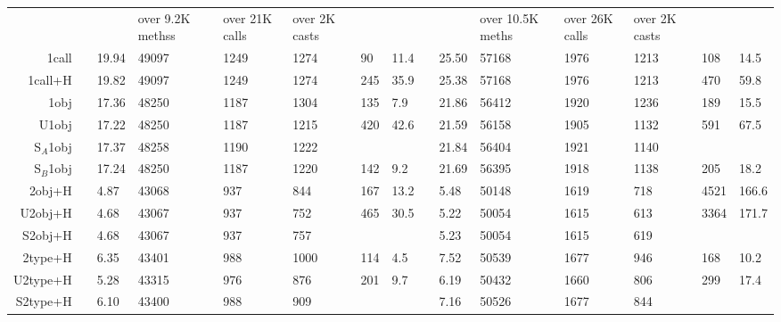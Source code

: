 \begin{table}
{\begin{tabular}{|r|c|l|p{1cm}|p{1cm}|p{1cm}!{\vrule width 2pt}l|l!{\vrule width 2pt}c|l|p{1cm}|p{1cm}|p{1cm}!{\vrule width 2pt}l|l|}
 &
over 9.2K methss &
over 21K calls &
over 2K casts &
 &
over 10.5K meths &
over 26K calls &
over 2K casts &
 \\
1call &  & 19.94 & 49097 & 1249 & 1274 & 90 & 11.4 &  & 25.50 & 57168 & 1976 & 1213 & 108 & 14.5 \\
1call+H & & 19.82 & 49097 & 1249 & 1274 & 245 & 35.9 & & 25.38 & 57168 & 1976 & 1213 & 470 & 59.8 \\
1obj & & 17.36 & 48250 & 1187 & 1304 & 135 & 7.9 & & 21.86 & 56412 & 1920 & 1236 & 189 & 15.5 \\
U1obj & & 17.22 & 48250 & 1187 & 1215 & 420 & 42.6 & & 21.59 & 56158 & 1905 & 1132 & 591 & 67.5 \\
S$_A$1obj & & 17.37 & 48258 & 1190 & 1222 &  &  & & 21.84 & 56404 & 1921 & 1140 &  &  \\
S$_B$1obj & & 17.24 & 48250 & 1187 & 1220 & 142 & 9.2 & & 21.69 & 56395 & 1918 & 1138 & 205 & 18.2 \\
2obj+H & & 4.87 & 43068 & 937 & 844 & 167 & 13.2 & & 5.48 & 50148 & 1619 & 718 & 4521 & 166.6 \\
U2obj+H & & 4.68 & 43067 & 937 & 752 & 465 & 30.5 & & 5.22 & 50054 & 1615 & 613 & 3364 & 171.7 \\
S2obj+H & & 4.68 & 43067 & 937 & 757 &  &  & & 5.23 & 50054 & 1615 & 619 &  &  \\
2type+H & & 6.35 & 43401 & 988 & 1000 & 114 & 4.5 & & 7.52 & 50539 & 1677 & 946 & 168 & 10.2 \\
U2type+H & & 5.28 & 43315 & 976 & 876 & 201 & 9.7 & & 6.19 & 50432 & 1660 & 806 & 299 & 17.4 \\
S2type+H & & 6.10 & 43400 & 988 & 909 &  &  & & 7.16 & 50526 & 1677 & 844 &  &  \\
\end{tabular}
} %

\end{table}

